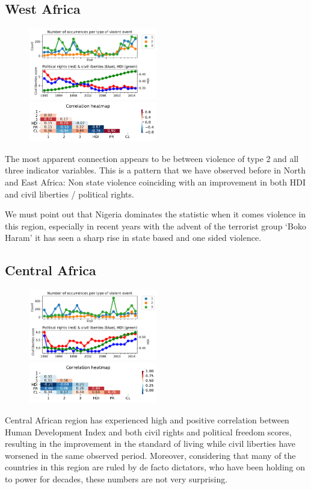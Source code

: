 \documentclass[a4paper,11pt]{article}
\begin{document}
\subsection{West Africa}
\begin{figure}[ht!]
    \includegraphics[width=0.50\textwidth]{images/wa.pdf}
    \includegraphics[width=0.50\textwidth]{images/wa_corr.pdf}
\end{figure}
The most apparent connection appears to be between violence of type 2 and all three indicator variables. This is a pattern that we have observed before in North and East Africa: Non state violence coinciding with an improvement in both HDI and civil liberties / political rights. 

We must point out that Nigeria dominates the statistic when it comes violence in this region, especially in recent years with the advent of the terrorist group `Boko Haram' it has seen a sharp rise in state based and one sided violence.

\subsection{Central Africa}
\begin{figure}[ht!]
    \includegraphics[width=0.50\textwidth]{images/ca.pdf}
    \includegraphics[width=0.50\textwidth]{images/ca_corr.pdf}
\end{figure}
Central African region has experienced high and positive correlation between Human Development Index and both civil rights and political freedom scores, resulting in the improvement in the standard of living while civil liberties have worsened in the same observed period. Moreover, considering that many of the countries in this region are ruled by de facto dictators, who have been holding on to power for decades, these numbers are not very surprising.
\end{document}
